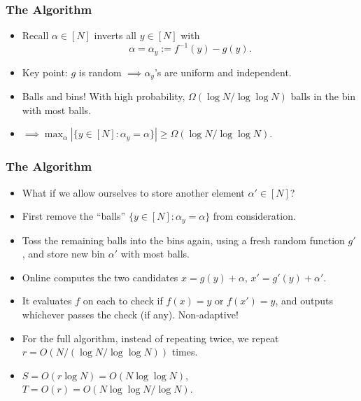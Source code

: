 \documentclass[usenames, dvipsnames, t, table]{beamer}
\begin{document}
  \begin{frame}
    \frametitle{The Algorithm}
    \begin{itemize}
    \item Recall $\alpha \in [N]$ inverts all $y \in [N]$ with
      \[\alpha = \alpha_y := f^{-1}(y) - g(y).\]
      \mypause
    \item Key point: $g$ is random $\implies \alpha_y$'s are uniform and independent.
      \pause
    \item Balls and bins! With high probability, $\Omega(\log N / \log \log N)$ balls in the bin with most balls.
      \pause
\item $\implies \max_{\alpha} |\{y \in [N] : \alpha_y = \alpha\}| \geq \Omega(\log N / \log \log N)$.
    \end{itemize}
  \end{frame}

  \begin{frame}
    \frametitle{The Algorithm}
    \begin{itemize}
    \item What if we allow ourselves to store another element $\alpha' \in [N]$?
      \pause
    \item First remove the ``balls'' $\{y \in [N] : \alpha_y = \alpha\}$ from consideration.
      \pause
    \item Toss the remaining balls into the bins again, using a fresh random function $g'$, and store new bin $\alpha'$ with most balls.
      \pause
    \item Online computes the two candidates $x = g(y) + \alpha$, $x' = g'(y) + \alpha'$.
      \pause
    \item It evaluates $f$ on each to check if $f(x) = y$ or $f(x') = y$, and outputs whichever passes the check (if any). Non-adaptive!
      \pause
    \item For the full algorithm, instead of repeating twice, we repeat $r = O(N / (\log N / \log \log N))$ times.
      \pause
    \item $S = O(r \log N) = O(N \log \log N)$, $T = O(r) = O(N \log \log N / \log N)$.
    \end{itemize}
  \end{frame}
\end{document}
